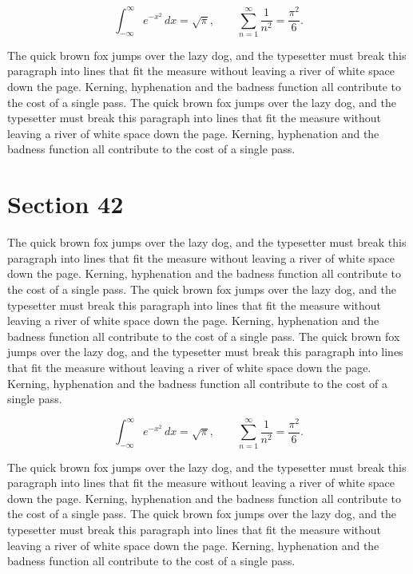 \documentclass{article}
\begin{document}
\begin{equation}
\int_{-\infty}^{\infty} e^{-x^{2}}\,dx = \sqrt{\pi}, \qquad
\sum_{n=1}^{\infty} \frac{1}{n^{2}} = \frac{\pi^{2}}{6}.
\end{equation}

The quick brown fox jumps over the lazy dog, and the typesetter must break this paragraph into lines that fit the measure without leaving a river of white space down the page. Kerning, hyphenation and the badness function all contribute to the cost of a single pass. The quick brown fox jumps over the lazy dog, and the typesetter must break this paragraph into lines that fit the measure without leaving a river of white space down the page. Kerning, hyphenation and the badness function all contribute to the cost of a single pass. 
\section{Section 42}
The quick brown fox jumps over the lazy dog, and the typesetter must break this paragraph into lines that fit the measure without leaving a river of white space down the page. Kerning, hyphenation and the badness function all contribute to the cost of a single pass. The quick brown fox jumps over the lazy dog, and the typesetter must break this paragraph into lines that fit the measure without leaving a river of white space down the page. Kerning, hyphenation and the badness function all contribute to the cost of a single pass. The quick brown fox jumps over the lazy dog, and the typesetter must break this paragraph into lines that fit the measure without leaving a river of white space down the page. Kerning, hyphenation and the badness function all contribute to the cost of a single pass. 

\begin{equation}
\int_{-\infty}^{\infty} e^{-x^{2}}\,dx = \sqrt{\pi}, \qquad
\sum_{n=1}^{\infty} \frac{1}{n^{2}} = \frac{\pi^{2}}{6}.
\end{equation}

The quick brown fox jumps over the lazy dog, and the typesetter must break this paragraph into lines that fit the measure without leaving a river of white space down the page. Kerning, hyphenation and the badness function all contribute to the cost of a single pass. The quick brown fox jumps over the lazy dog, and the typesetter must break this paragraph into lines that fit the measure without leaving a river of white space down the page. Kerning, hyphenation and the badness function all contribute to the cost of a single pass. 
\end{document}
